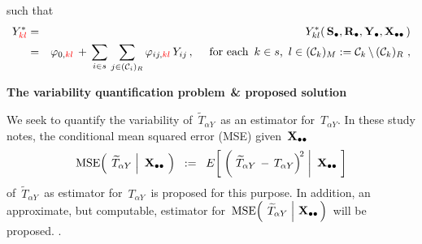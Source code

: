 \begin{itemize}
\begin{center}
\begin{minipage}{6.3in}
    such that
    \begin{eqnarray*}
    Y_{{\color{red}kl}}^{*}
    & = &
        Y^{*}_{kl}(\,\mathbf{S}_{\bullet},\mathbf{R}_{\bullet},\mathbf{Y}_{\bullet},\mathbf{X}_{\bullet\bullet}\,)
    \\
    & = &
        \varphi_{0,{\color{red}kl}}
        \, + \,
        \underset{i \in s}{\sum}\;
        \underset{j \in (\mathcal{C}_{i})_{R}}{\sum}\,
        \varphi_{ij,{\color{red}kl}}\,Y_{ij}\,,
        \quad
        \textnormal{
            for each
            \,$k \in s$,
            \,$l \in (\mathcal{C}_{k})_{M} := \mathcal{C}_{k} \,\backslash\, (\mathcal{C}_{k})_{R}$
            },
    \end{eqnarray*}
    \end{minipage}
    \end{center}
\end{itemize}
\vskip 0.1cm
\begin{center}
\begin{minipage}{5.5in}
\begin{tcolorbox}[arc=8px, colback=white, colframe=black]
\begin{center}
\textbf{The variability quantification problem$\overset{{\color{white}1}}{\textnormal{\color{white}.}}$\& proposed solution}
\end{center}
We seek to quantify the variability of
\,$\widetilde{T}_{\alpha Y}$\,
as an estimator for
\,$T_{\alpha Y}$.
\vskip 0.1cm
In these study notes,
the conditional mean squared error (MSE) given \,$\mathbf{X}_{\bullet\bullet}$\,
\begin{equation*}
\textnormal{MSE}\!\left(\;
    \left.
    \widetilde{T}_{\alpha Y}
    \;\right\vert\!
    \begin{array}{c} \mathbf{X}_{\bullet\bullet} \end{array}
    \!\right)
\;\; := \;\;
    E\!\left[\;\left(\,
        \left.
        \widetilde{T}_{\alpha Y}
        \, - \,
        T_{\alpha Y}
        \right)^{\!2}
        \;\right\vert\!
        \begin{array}{c} \mathbf{X}_{\bullet\bullet} \end{array}
        \!\right]
\end{equation*}
of
\,$\widetilde{T}_{\alpha Y}$\,
as estimator for
\,$T_{\alpha Y}$\,
is proposed for this purpose.
\vskip 0.3cm
\noindent
In addition, an approximate, but computable, estimator for
\,$
\textnormal{MSE}\!\left(\;
    \left.
    \widetilde{T}_{\alpha Y}
    \;\right\vert\!\!
    \begin{array}{c} \mathbf{X}_{\bullet\bullet} \end{array}
    \!\!\right)
$\,
will be proposed.
\vskip -0.25cm
{\color{white}.}
\end{tcolorbox}
\end{minipage}
\end{center}
